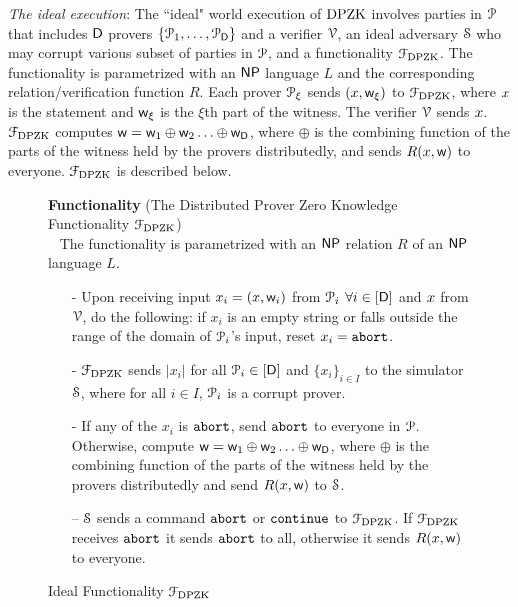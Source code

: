 \noindent\textit{The ideal execution}: The ``ideal" world execution of $\text{DPZK}$  involves parties in $\mathcal{P}$ that includes $\mathsf{D}$ provers $\{\mathcal{P}_1, \ldots, \mathcal{P}_{\mathsf{D}}\}$ and a verifier $\mathcal{V}$,  an ideal adversary $\mathcal{S}$ who may corrupt various subset of parties in $\mathcal{P}$, and a  functionality $\mathcal{F}_{\text{DPZK}}$.  The functionality is parametrized with an  $\mathsf{NP}$ language $L$ and  the corresponding relation/verification function $R$. Each prover $\mathcal{P}_\xi$ sends $({x},\mathsf{w}_{\xi})$ to $\mathcal{F}_{\text{DPZK}}$, where ${x}$ is the statement and $\mathsf{w}_{\xi}$ is the $\xi$th part of the witness. The verifier $\mathcal{V}$ sends ${x}$.  $\mathcal{F}_{\text{DPZK}}$ computes $\mathsf{w} = \mathsf{w}_1 \oplus \mathsf{w}_2 \ldots \oplus \mathsf{w}_{\mathsf{D}}$, where $\oplus$ is the combining function of the parts of the witness held by the provers distributedly, and sends $R({x},\mathsf{w})$ to everyone. $\mathcal{F}_{\text{DPZK}}$  is described below. 
\begin{figure}[h!]
	\centering
	\begin{framed}
		\textbf{Functionality} (The Distributed Prover Zero Knowledge Functionality $\mathcal{F}_{\text{DPZK}}$)\\~
		The functionality is parametrized with an $\mathsf{NP}$ relation $R$ of an $\mathsf{NP}$ language $L$.
		\begin{itemize}
			\item[-] Upon receiving input $x_i = ({x}, \mathsf{w}_i)$ from $\mathcal{P}_i$ $\forall i\in[\mathsf{D}]$ and ${x}$ from $\mathcal{V}$, do the following: if $x_i$ is an empty string or falls outside the range of the domain of $\mathcal{P}_i$'s input,  reset $x_i = \texttt{abort}$. 
			\item[-] $\mathcal{F}_{\text{DPZK}}$ sends $|x_i|$ for all $\mathcal{P}_i \in [\mathsf{D}]$ and $\{x_i\}_{i\in I}$ to the simulator $\mathcal{S}$, where for all $i\in I$, $\mathcal{P}_i$ is a corrupt prover.
			\item[-] If any of the $x_i$ is $\texttt{abort}$, send $\texttt{abort}$ to everyone in $\mathcal{P}$. Otherwise,   compute $\mathsf{w} = \mathsf{w}_1 \oplus \mathsf{w}_2 \ldots \oplus \mathsf{w}_{\mathsf{D}}$, where $\oplus$ is the combining function of the parts of the witness held by the provers distributedly and send $R({x}, \mathsf{w})$ to $\mathcal{S}$. 
			\item[--] $\mathcal{S}$ sends a command $\texttt{abort}$ or $\texttt{continue}$ to $\mathcal{F}_{\text{DPZK}}$. If $\mathcal{F}_{\text{DPZK}}$ receives $\texttt{abort}$ it sends $\texttt{abort}$ to all, otherwise it sends $R({x}, \mathsf{w})$ to everyone. 
		\end{itemize}
	\end{framed}
	\caption{Ideal Functionality $\mathcal{F}_{\text{DPZK}}$}
\end{figure} \label{func:DPZK}

